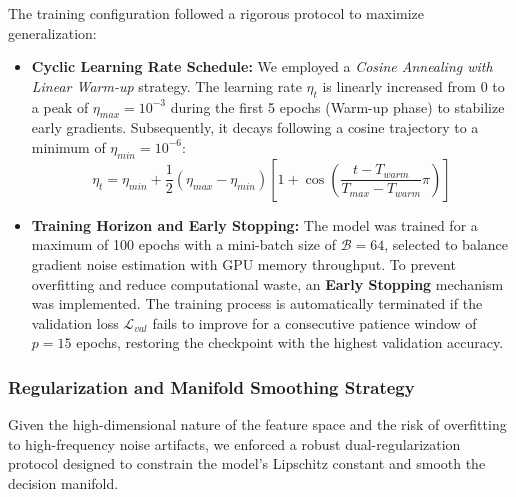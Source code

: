 \documentclass[5p,times,twocolumn]{elsarticle}
\begin{document}
The training configuration followed a rigorous protocol to maximize generalization:
\begin{itemize}
    \item \textbf{Cyclic Learning Rate Schedule:} We employed a \textit{Cosine Annealing with Linear Warm-up} strategy. The learning rate $\eta_t$ is linearly increased from 0 to a peak of $\eta_{max} = 10^{-3}$ during the first 5 epochs (Warm-up phase) to stabilize early gradients. Subsequently, it decays following a cosine trajectory to a minimum of $\eta_{min} = 10^{-6}$:
    \begin{equation}
        \eta_t = \eta_{min} + \frac{1}{2}(\eta_{max} - \eta_{min})\left[1 + \cos\left(\frac{t - T_{warm}}{T_{max} - T_{warm}}\pi\right)\right]
    \end{equation}
    
    
    \item \textbf{Training Horizon and Early Stopping:} The model was trained for a maximum of 100 epochs with a mini-batch size of $\mathcal{B}=64$, selected to balance gradient noise estimation with GPU memory throughput. To prevent overfitting and reduce computational waste, an \textbf{Early Stopping} mechanism was implemented. The training process is automatically terminated if the validation loss $\mathcal{L}_{val}$ fails to improve for a consecutive patience window of $p=15$ epochs, restoring the checkpoint with the highest validation accuracy.
\end{itemize}

\subsubsection{Regularization and Manifold Smoothing Strategy}
Given the high-dimensional nature of the feature space and the risk of overfitting to high-frequency noise artifacts, we enforced a robust dual-regularization protocol designed to constrain the model's Lipschitz constant and smooth the decision manifold.
\end{document}
